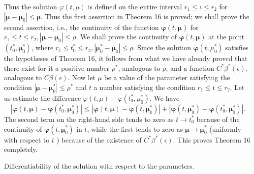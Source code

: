 \documentclass[10pt,a5paper]{book}
\makeatletter
\theoremstyle{plain}
\theoremstyle{definition}
\theoremstyle{remark}
\renewenvironment{proof}[1][\proofname]{\par
  \pushQED{\qed}%
  \normalfont\topsep6\p@\@plus6\p@\relax
  \trivlist
  \item\relax{\itshape #1\@addpunct{.}}\hspace\labelsep\ignorespaces
}{\popQED\endtrivlist\@endpefalse}
\makeatother
\begin{document}
\begin{proof}
Thus the solution $\varphi(t, \mu)$ is defined on the entire interval $r_{1} \leq \iota \leq r_{2}$ for $\left|\boldsymbol{\mu}-\boldsymbol{\mu}_{0}\right| \leq \boldsymbol{\rho}$. Thus the first assertion in Theorem 16 is proved; we shall prove the second assertion, i.e., the continuity of the function $\boldsymbol{\varphi}(t, \boldsymbol{\mu})$ for $r_{1} \leq t \leq r_{2},\left|\boldsymbol{\mu}-\boldsymbol{\mu}_{0}\right| \leq \rho$. We shall prove the continuity of $\boldsymbol{\varphi}(t, \boldsymbol{\mu})$ at the point $\left(t_{0}^{*}, \boldsymbol{\mu}_{0}^{*}\right)$, where $r_{1} \leq t_{0}^{*} \leq r_{2},\left|\boldsymbol{\mu}_{0}^{*}-\boldsymbol{\mu}_{0}\right| \leq \rho$. Since the solution $\boldsymbol{\varphi}\left(t, \mu_{0}^{*}\right)$ satisfies the hypotheses of Theorem 16, it follows from what we have already proved that there exist for it a positive number $\rho^{*}$, analogous to $\rho$, and a function $C^{*} \beta^{*}(\epsilon)$, analogous to $C \beta(\epsilon)$. Now let $\mu$ be a value of the parameter satisfying the condition $\left|\boldsymbol{\mu}-\boldsymbol{\mu}_{0}^{*}\right| \leq \rho^{*}$ and $t$ a number satisfying the condition $r_{1} \leq t \leq r_{2}$. Let us estimate the difference $\varphi(t, \mu)-\varphi\left(t_{0}^{*}, \mu_{0}^{*}\right)$. We have
\[
\left|\boldsymbol{\varphi}(t, \boldsymbol{\mu})-\boldsymbol{\varphi}\left(t_{0}^{*}, \boldsymbol{\mu}_{0}^{*}\right)\right| \leq\left|\boldsymbol{\varphi}(t, \boldsymbol{\mu})-\boldsymbol{\varphi}\left(t, \boldsymbol{\mu}_{0}^{*}\right)\right|+\left|\boldsymbol{\varphi}\left(t, \boldsymbol{\mu}_{0}^{*}\right)-\boldsymbol{\varphi}\left(t_{0}^{*}, \boldsymbol{\mu}_{0}^{*}\right)\right| .
\]
The second term on the right-hand side tends to zero as $t \rightarrow t_{0}^{*}$ because of the continuity of $\boldsymbol{\varphi}\left(t, \boldsymbol{\mu}_{0}^{*}\right)$ in $t$, while the first tends to zero as $\boldsymbol{\mu} \rightarrow \boldsymbol{\mu}_{0}^{*}$
(uniformly with respect to $t$ ) because of the existence of $C^{*} \beta^{*}(\epsilon)$. This proves Theorem 16 completely.
\end{proof}

Differentiability of the solution with respect to the parameters.
\end{document}
